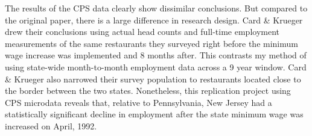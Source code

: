 \documentclass[11pt]{article}
\begin{document}
The results of the CPS data clearly show dissimilar conclusions. But compared to the original paper, there is a large difference in research design. Card \& Krueger drew their conclusions using actual head counts and full-time employment measurements of the same restaurants they surveyed right before the minimum wage increase was implemented and 8 months after. This contrasts my method of using state-wide month-to-month employment data across a 9 year window. Card \& Krueger also narrowed their survey population to restaurants located close to the border between the two states. Nonetheless, this replication project using CPS microdata reveals that, relative to Pennsylvania, New Jersey had a statistically significant decline in employment after the state minimum wage was increased on April, 1992. 
 
\end{document}
